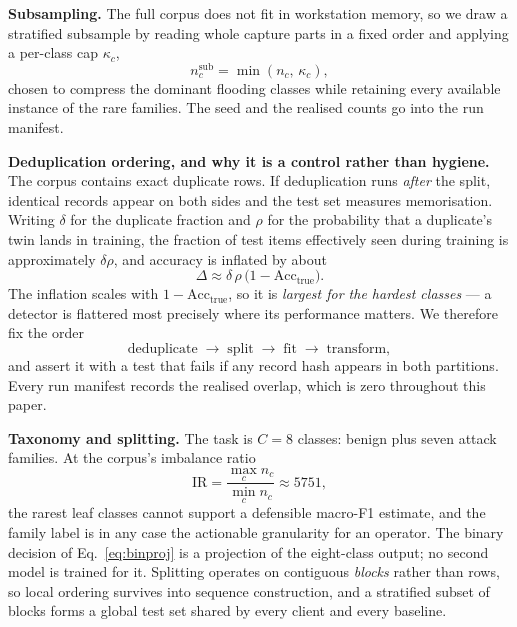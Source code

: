 \documentclass[conference]{IEEEtran}
\begin{document}
\textbf{Subsampling.} The full corpus does not fit in workstation memory, so we draw a stratified
subsample by reading whole capture parts in a fixed order and applying a per-class cap $\kappa_c$,
\begin{equation}
n^{\text{sub}}_c = \min(n_c,\, \kappa_c),
\label{eq:cap}
\end{equation}
chosen to compress the dominant flooding classes while retaining every available instance of the
rare families. The seed and the realised counts go into the run manifest.

\textbf{Deduplication ordering, and why it is a control rather than hygiene.} The corpus contains
exact duplicate rows. If deduplication runs \emph{after} the split, identical records appear on
both sides and the test set measures memorisation. Writing $\delta$ for the duplicate fraction and
$\rho$ for the probability that a duplicate's twin lands in training, the fraction of test items
effectively seen during training is approximately $\delta\rho$, and accuracy is inflated by about
\begin{equation}
\Delta \approx \delta\,\rho\,\big(1 - \text{Acc}_{\text{true}}\big).
\label{eq:leak}
\end{equation}
The inflation scales with $1 - \text{Acc}_{\text{true}}$, so it is \emph{largest for the hardest
classes} --- a detector is flattered most precisely where its performance matters. We therefore fix
the order
\begin{equation}
\text{deduplicate} \;\rightarrow\; \text{split} \;\rightarrow\; \text{fit} \;\rightarrow\;
\text{transform},
\label{eq:order}
\end{equation}
and assert it with a test that fails if any record hash appears in both partitions. Every run
manifest records the realised overlap, which is zero throughout this paper.

\textbf{Taxonomy and splitting.} The task is $C = 8$ classes: benign plus seven attack families.
At the corpus's imbalance ratio
\begin{equation}
\mathrm{IR} = \frac{\max_c n_c}{\min_c n_c} \approx 5751,
\label{eq:ir}
\end{equation}
the rarest leaf classes cannot support a defensible macro-F1 estimate, and the family label is in
any case the actionable granularity for an operator. The binary decision of
Eq.~\eqref{eq:binproj} is a projection of the eight-class output; no second model is trained for
it. Splitting operates on contiguous \emph{blocks} rather than rows, so local ordering survives
into sequence construction, and a stratified subset of blocks forms a global test set shared by
every client and every baseline.
\end{document}
